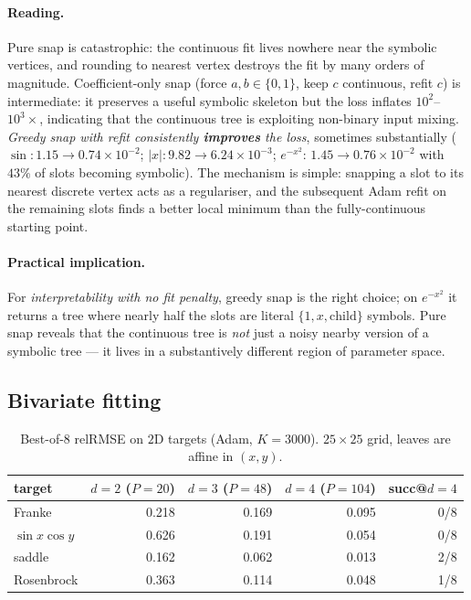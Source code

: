\documentclass[11pt]{article}
\begin{document}
\paragraph{Reading.}
Pure snap is catastrophic: the continuous fit lives nowhere near the
symbolic vertices, and rounding to nearest vertex destroys the fit by
many orders of magnitude. Coefficient-only snap (force $a, b \in \{0,1\}$,
keep $c$ continuous, refit $c$) is intermediate: it preserves a useful
symbolic skeleton but the loss inflates $10^2$--$10^3 \times$, indicating
that the continuous tree is exploiting non-binary input mixing. \emph{Greedy
snap with refit consistently \textbf{improves} the loss}, sometimes
substantially ($\sin: 1.15 \to 0.74 \times 10^{-2}$; $|x|: 9.82 \to 6.24
\times 10^{-3}$; $e^{-x^2}$: $1.45 \to 0.76 \times 10^{-2}$ with $43\%$
of slots becoming symbolic). The mechanism is simple: snapping a slot to
its nearest discrete vertex acts as a regulariser, and the subsequent
Adam refit on the remaining slots finds a better local minimum than the
fully-continuous starting point.

\paragraph{Practical implication.}
For \emph{interpretability with no fit penalty}, greedy snap is the right
choice; on $e^{-x^2}$ it returns a tree where nearly half the slots are
literal $\{1, x, \text{child}\}$ symbols. Pure snap reveals that the
continuous tree is \emph{not} just a noisy nearby version of a symbolic
tree --- it lives in a substantively different region of parameter
space.

\subsection{Bivariate fitting}

\begin{table}[h]
\centering\small
\caption{Best-of-$8$ relRMSE on $2$D targets (Adam, $K{=}3000$). $25\times25$
grid, leaves are affine in $(x,y)$.}
\label{tab:2d}
\begin{tabular}{lrrrr}
\toprule
target     & $d{=}2$ ($P{=}20$) & $d{=}3$ ($P{=}48$) & $d{=}4$ ($P{=}104$) & succ@$d{=}4$ \\
\midrule
Franke     & 0.218 & 0.169 & 0.095 & 0/8 \\
$\sin x \cos y$ & 0.626 & 0.191 & 0.054 & 0/8 \\
saddle     & 0.162 & 0.062 & 0.013 & 2/8 \\
Rosenbrock & 0.363 & 0.114 & 0.048 & 1/8 \\
\bottomrule
\end{tabular}
\end{table}
\end{document}
